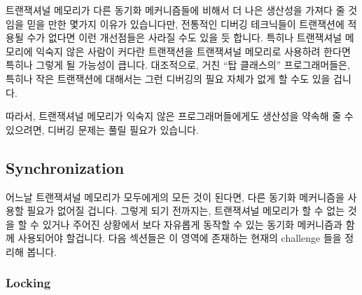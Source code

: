 트랜잭셔널 메모리가 다른 동기화 메커니즘들에 비해서 더 나은 생산성을 가져다 줄
것임을 믿을 만한 몇가지 이유가 있습니다만, 전통적인 디버깅 테크닉들이
트랜잭션에 적용될 수가 없다면 이런 개선점들은 사라질 수도 있을 듯 합니다.
특히나 트랜잭셔널 메모리에 익숙지 않은 사람이 커다란 트랜잭션을 트랜잭셔널
메모리로 사용하려 한다면 특히나 그렇게 될 가능성이 큽니다.
대조적으로, 거친 ``탑 클래스의'' 프로그래머들은, 특히나 작은 트랜잭션에
대해서는 그런 디버깅의 필요 자체가 없게 할 수도 있을 겁니다.

따라서, 트랜잭셔널 메모리가 익숙지 않은 프로그래머들에게도 생산성을 약속해 줄
수 있으려면, 디버깅 문제는 풀릴 필요가 있습니다.

\subsection{Synchronization}
\label{sec:future:Synchronization}

어느날 트랜잭셔널 메모리가 모두에게의 모든 것이 된다면, 다른 동기화 메커니즘을
사용할 필요가 없어질 겁니다.
그렇게 되기 전까지는, 트랜잭셔널 메모리가 할 수 없는 것을 할 수 있거나 주어진
상황에서 보다 자유롭게 동작할 수 있는 동기화 메커니즘과 함께 사용되어야
할겁니다.
다음 섹션들은 이 영역에 존재하는 현재의 challenge 들을 정리해 봅니다.

\subsubsection{Locking}
\label{sec:future:Locking}

